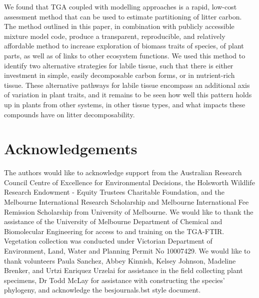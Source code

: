 \documentclass{article}
\begin{document}
We found that TGA coupled with modelling approaches is a rapid, low-cost assessment method that can be used to estimate partitioning of litter carbon. The method outlined in this paper, in combination with publicly accessible mixture model code, produce a transparent, reproducible, and relatively affordable method to increase exploration of biomass traits of species, of plant parts, as well as of links to other ecosystem functions. We used this method to identify two alternative strategies for labile tissue, such that there is either investment in simple, easily decomposable carbon forms, or in nutrient-rich tissue. These alternative pathways for labile tissue encompass an additional axis of variation in plant traits, and it remains to be seen how well this pattern holds up in plants from other systems, in other tissue types, and what impacts these compounds have on litter decomposability. 

\section{Acknowledgements}
The authors would like to acknowledge support from the Australian Research Council Centre of Excellence for Environmental Decisions, the Holsworth Wildlife Research Endowment - Equity Trustees Charitable Foundation, and the Melbourne International Research Scholarship and Melbourne International Fee Remission Scholarship from University of Melbourne. We would like to thank the assistance of the University of Melbourne Department of Chemical and Biomolecular Engineering for access to and training on the TGA-FTIR. Vegetation collection was conducted under Victorian Department of Environment, Land, Water and Planning Permit No 10007429. We would like to thank volunteers Paula Sanchez, Abbey Kinnish, Kelsey Johnson, Madeline Brenker, and Urtzi Enriquez Urzelai for assistance in the field collecting plant specimens, Dr Todd McLay for assistance with constructing the species' phylogeny, and acknowledge the besjournals.bst style document. 


\end{document}

